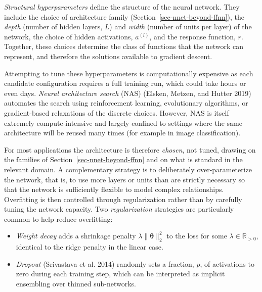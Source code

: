 \documentclass[
  letterpaper,
  krantz2]{style/krantz}
\providecommand{\tightlist}{%
  \setlength{\itemsep}{0pt}\setlength{\parskip}{0pt}}
\begin{document}
\emph{Structural hyperparameters} define the structure of the neural
network. They include
the choice of architecture family (Section~\ref{sec-nnet-beyond-ffnn}),
the \emph{depth} (number of hidden layers, \(L\)) and \emph{width}
(number of units per layer) of the network, the choice of hidden
activations, \(a^{(l)}\), and the response function,
\(r\).
Together, these choices determine the class of functions that the
network can represent, and therefore the solutions available to gradient
descent.

Attempting to tune these hyperparameters is computationally expensive as
each candidate configuration requires a full training run, which could
take hours or even days. \emph{Neural architecture search} (NAS)
(Elsken, Metzen, and Hutter 2019) automates the search using
reinforcement learning, evolutionary algorithms, or gradient-based
relaxations of the discrete
choices. However, NAS
is itself extremely compute-intensive and largely confined to settings
where the same architecture will be reused many times (for example in
image classification).

For most applications the architecture is therefore \emph{chosen}, not
tuned, drawing on the families of Section~\ref{sec-nnet-beyond-ffnn} and
on what is standard in the relevant domain. A complementary strategy is
to deliberately over-parameterize the network, that is, to use more
layers or units than are strictly necessary so that the network is
sufficiently flexible to model complex
relationships. Overfitting is then
controlled through regularization rather than by carefully tuning the
network
capacity.
Two \emph{regularization} strategies are particularly common to help
reduce overfitting:

\begin{itemize}
\tightlist
\item
  \emph{Weight decay} adds a shrinkage penalty
  \(\lambda\|\boldsymbol{\theta}\|_2^2\) to the loss for some
  \(\lambda \in \mathbb{R}_{>0}\), identical to the ridge penalty in the
  linear case.
\item
  \emph{Dropout} (Srivastava et al. 2014) randomly sets a fraction,
  \(p\), of activations to zero during each training step, which can be
  interpreted as implicit ensembling over thinned
  sub-networks.
\end{itemize}
\end{document}
